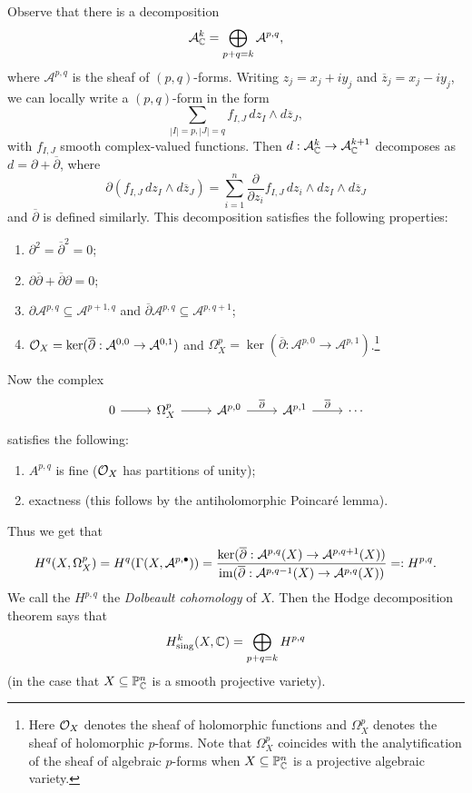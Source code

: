 \begin{remark}
  Observe that there is a decomposition
  \[
    \mathcal{A}^k_{\mathbb{C}}
    = \bigoplus_{p + q = k} \mathcal{A}^{p, q},
  \]
  where $\mathcal{A}^{p, q}$ is the sheaf
  of $(p, q)$-forms. Writing
  $z_j = x_j + i y_j$ and $\overline{z}_j = x_j - i y_j$, we can locally write a
  $(p, q)$-form in the form
  \[
    \sum_{|I| = p, |J| = q} f_{I, J}\,
    d z_I \wedge d \overline{z}_J,
  \]
  with $f_{I, J}$
  smooth complex-valued functions. Then
    $d : \mathcal{A}^k_{\mathbb{C}} \to \mathcal{A}^{k + 1}_{\mathbb{C}}$
  decomposes  as $d = \partial + \overline{\partial}$, where
  \[
    \partial (f_{I, J}\, dz_I \wedge d\overline{z}_J)
    = \sum_{i = 1}^n \frac{\partial}{\partial z_i} f_{I, J}\, dz_i \wedge dz_I \wedge d\overline{z}_J
  \]
  and $\overline{\partial}$ is defined similarly.
  This decomposition satisfies the following properties:
  \begin{enumerate}
    \item $\partial^2 = \overline{\partial}^2 = 0$;
    \item $\partial \overline{\partial} + \overline{\partial} \partial = 0$;
    \item $\partial \mathcal{A}^{p, q} \subseteq \mathcal{A}^{p + 1, q}$ and $\overline{\partial} \mathcal{A}^{p, q} \subseteq \mathcal{A}^{p, q + 1}$;
    \item $\mathcal{O}_X = \ker(\overline{\partial} : \mathcal{A}^{0, 0} \to \mathcal{A}^{0, 1})$
      and $\Omega_X^p = \ker(\overline{\partial} : \mathcal{A}^{p, 0} \to \mathcal{A}^{p, 1})$.\footnote{Here $\mathcal{O}_X$ denotes the sheaf of holomorphic functions and $\Omega_X^p$ denotes the sheaf of holomorphic $p$-forms. Note that $\Omega_X^p$ coincides with the analytification of the sheaf of algebraic $p$-forms when $X \subseteq \mathbb{P}^n_{\mathbb{C}}$ is a projective algebraic variety.}
  \end{enumerate}
  Now the complex
  \[
    \begin{tikzcd}
      0 \ar[r] & \Omega_X^p
      \ar[r] & \mathcal{A}^{p, 0}
      \ar[r, "\overline{\partial}"] & \mathcal{A}^{p, 1}
      \ar[r, "\overline{\partial}"] & \cdots
    \end{tikzcd}
  \]
  satisfies the following:
  \begin{enumerate}
    \item $A^{p, q}$ is fine
      ($\mathcal{O}_X$ has partitions of unity);
    \item exactness (this follows
      by the antiholomorphic Poincar\'e lemma).
  \end{enumerate}
  Thus we get that
  \[
    H^q(X, \Omega_X^p)
    = H^q(\Gamma(X, \mathcal{A}^{p, \bullet}))
    = \frac{\ker(\overline{\partial} : \mathcal{A}^{p, q}(X) \to \mathcal{A}^{p, q + 1}(X))}{\operatorname{im}(\overline{\partial} : \mathcal{A}^{p, q - 1}(X) \to \mathcal{A}^{p, q}(X))}
    =: H^{p, q}.
  \]
  We call the $H^{p, q}$ the
  \emph{Dolbeault cohomology} of $X$.
  Then the Hodge decomposition theorem
  says that
  \[
    H^k_{\mathrm{sing}}(X, \mathbb{C})
    = \bigoplus_{p + q = k} H^{p, q}
  \]
  (in the case that
  $X \subseteq \mathbb{P}^n_{\mathbb{C}}$ is
  a smooth projective variety).
\end{remark}
